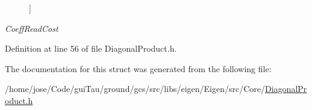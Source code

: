 \begin{Desc}
\begin{description}
{}]\item[{\em 
\hypertarget{structei__traits_3_01_product_3_01_lhs_nested_00_01_rhs_nested_00_01_diagonal_product_01_4_01_4_ae88383b36938bec3082772ff061c4982a6fac01b2f1c81787c777685084546bfe}{Coeff\-Read\-Cost}\label{structei__traits_3_01_product_3_01_lhs_nested_00_01_rhs_nested_00_01_diagonal_product_01_4_01_4_ae88383b36938bec3082772ff061c4982a6fac01b2f1c81787c777685084546bfe}
}]\end{description}
\end{Desc}


Definition at line 56 of file Diagonal\-Product.\-h.



The documentation for this struct was generated from the following file\-:\begin{DoxyCompactItemize}
\item 
/home/jose/\-Code/gui\-Tau/ground/gcs/src/libs/eigen/\-Eigen/src/\-Core/\hyperlink{_diagonal_product_8h}{Diagonal\-Product.\-h}\end{DoxyCompactItemize}
